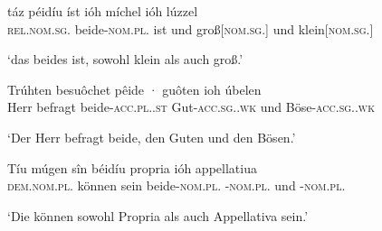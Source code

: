 
\begin{exe}
\ex \label{ex:beidejohahd}
	\begin{xlist}
	\ex \label{ex:beidejohahd_1}
		\gll táz péidíu íst ióh míchel ióh lúzzel \\
			\textsc{rel.nom.sg.\NeutI} beide-\textsc{nom.pl.\NeutI} ist und
			groß[\textsc{nom.sg.\NeutI}] und klein[\textsc{nom.sg.\NeutI}] \\
		\begin{taggedline}{\parencites(11.~Jh.)[Notker, Boethius/Categoriae 57: 28--34]{ddd}}
		\trans `das beides ist, sowohl klein als auch groß.'
		\end{taggedline}

	\ex \label{ex:beidejohahd_2}
		\gll Trúhten besuôchet pêide · guôten ioh
				úbelen \\
			Herr befragt beide-\textsc{acc.pl.\MascA.st} {}
				Gut-\textsc{acc.sg.\MascA.wk} und
				Böse-\textsc{acc.sg.\MascA.wk} \\
		\begin{taggedline}{\parencites(11.~Jh.)[Notker, Psalmen 10, 34--36: 395--401]{ddd}} %
		\trans `Der Herr befragt beide, den Guten und den Bösen.'
		\end{taggedline}

	\ex \label{ex:beidejohahd_3}
		\gll Tíu múgen sîn béidíu propria ióh appellatiua \\
			\textsc{dem.nom.pl.\NeutI} können sein beide-\textsc{nom.pl.\NeutI}
				-\textsc{nom.pl.\NeutI} und
				-\textsc{nom.pl.\NeutI} \\
		\begin{taggedline}{\parencites(11.~Jh.)[Notker, Boethius/Categoriae 6: 119--125]{ddd}}
		\trans `Die können sowohl Propria als auch Appellativa sein.'
		\end{taggedline}
	\end{xlist}
\end{exe}

